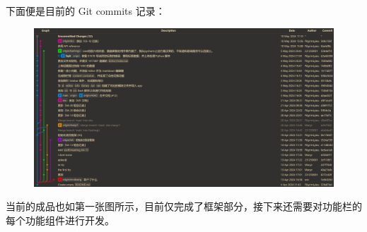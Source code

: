 \documentclass[
    UTF8,
    12pt,
    oneside,
    a4paper
]{ctexart}
\begin{document}
下面便是目前的 Git commits 记录：

\begin{figure}[H]
    \centering
    \includegraphics[scale=0.18]{img/commits.png}
\end{figure}

当前的成品也如第一张图所示，目前仅完成了框架部分，接下来还需要对功能栏的每个功能组件进行开发。
\end{document}
